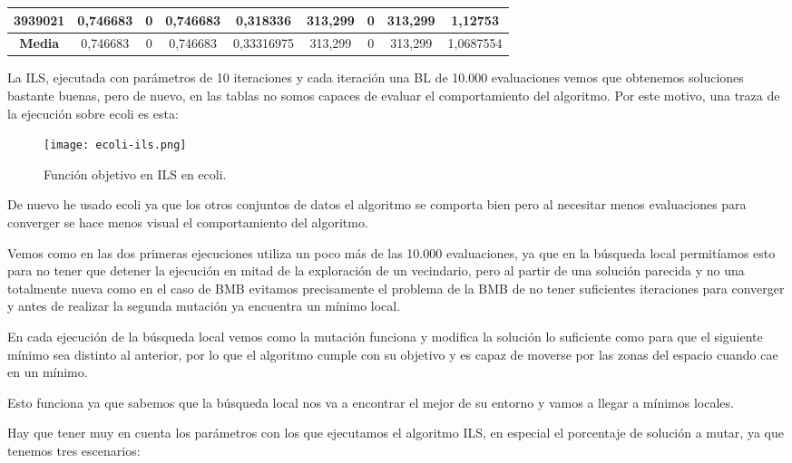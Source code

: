 \documentclass[12pt, spanish]{article}
\begin{document}
\begin{table}[H]
\begin{tabular}{|c|c|c|c|c|c|c|c|c|}
3939021           & 0,746683                  & 0                           & 0,746683               & 0,318336   & 313,299                   & 0                           & 313,299                & 1,12753    \\ \hline
\textbf{Media}    & 0,746683                  & 0                           & 0,746683               & 0,33316975 & 313,299                   & 0                           & 313,299                & 1,0687554  \\ \hline
\end{tabular}
\end{table}

La ILS, ejecutada con parámetros de 10 iteraciones y cada iteración una BL de 10.000 evaluaciones vemos que obtenemos soluciones bastante buenas, pero de nuevo, en las tablas no somos capaces de evaluar el comportamiento del algoritmo. Por este motivo, una traza de la ejecución sobre ecoli es esta:

\begin{figure}[H]
	\centering
	\texttt{[image: ecoli-ils.png]}
	
	\caption{Función objetivo en ILS en ecoli.}
	\label{fig:ils-cmp1}
\end{figure}

De nuevo he usado ecoli ya que los otros conjuntos de datos el algoritmo se comporta bien pero al necesitar menos evaluaciones para converger se hace menos visual el comportamiento del algoritmo.

Vemos como en las dos primeras ejecuciones utiliza un poco más de las 10.000 evaluaciones, ya que en la búsqueda local permitíamos esto para no tener que detener la ejecución en mitad de la exploración de un vecindario, pero al partir de una solución parecida y no una totalmente nueva como en el caso de BMB evitamos precisamente el problema de la BMB de no tener suficientes iteraciones para converger y antes de realizar la segunda mutación ya encuentra un mínimo local.

En cada ejecución de la búsqueda local vemos como la mutación funciona y modifica la solución lo suficiente como para que el siguiente mínimo sea distinto al anterior, por lo que el algoritmo cumple con su objetivo y es capaz de moverse por las zonas del espacio cuando cae en un mínimo.

Esto funciona ya que sabemos que la búsqueda local nos va a encontrar el mejor de su entorno y vamos a llegar a mínimos locales. 

Hay que tener muy en cuenta los parámetros con los que ejecutamos el algoritmo ILS, en especial el porcentaje de solución a mutar, ya que tenemos tres escenarios:
\end{document}
